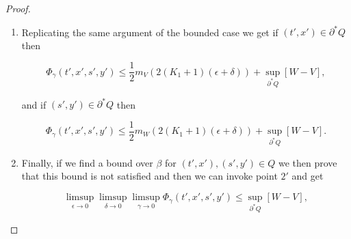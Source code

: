 \begin{proof}
\begin{enumerate}[label=\arabic*')]
        From $\Phi_{\gamma}(t',x',s',y')\geq\Phi_{\gamma}(t',y',s',y')$ we get

        \begin{align*}
            \frac{1}{2\epsilon}\abs{x'-y'}^2 & \leq W(t',x')-W(t',x') + \frac{\gamma}{2}[\abs{y'-x_{\gamma}}^2-\abs{x'-x_{\gamma}}^2] \\
            & \leq \frac{1}{2}m_W(\abs{x'-y'}^2) + \gamma\abs{x'-y'}^2 + \frac{\gamma}{2}\abs{x'-x_{\gamma}}^2 \\
            & \leq \frac{1}{2}m_W(\abs{x'-y'}^2) + \gamma\abs{x'-y'}^2 + \gamma,
        \end{align*}

        which implies

        \[\frac{1}{4\epsilon}\abs{x'-y'}^2\leq \frac{1}{2}m_W(\abs{x'-y'}^2)+\gamma\Rightarrow \abs{x'-y'}^2\leq 2(K_1+1)\epsilon.\]

        Therefore, we get

        \[\frac{1}{4\epsilon}\abs{x'-y'}^2\leq \left(\frac{1}{2\epsilon}-\gamma\right)\abs{x'-y'}^2\leq \frac{1}{2}m_W\left(2(K_1+1)\epsilon\right)+\gamma,\]

        hence the second equation in \ref{4-2-inproofSup:unboundedCLAIMS}.

        \item Replicating the same argument of the bounded case we get if $(t',x')\in\partial^{\ast}Q$ then
        
        \begin{equation*}
            \Phi_{\gamma}(t',x',s',y') \leq \frac{1}{2}m_V\left(2(K_1+1)(\epsilon+\delta)\right) + \sup_{\partial^{\ast}Q}[W-V],
        \end{equation*}

        and if $(s',y')\in\partial^{\ast}Q$ then

        \begin{equation*}
            \Phi_{\gamma}(t',x',s',y') \leq \frac{1}{2}m_W\left(2(K_1+1)(\epsilon+\delta)\right) + \sup_{\partial^{\ast}Q}[W-V].
        \end{equation*}

        \item Finally, if we find a bound over $\beta$ for $(t',x'),(s',y')\in Q$ we then prove that this bound is not satisfied and then we can invoke 
        point $2'$ and get

        \begin{equation*}
            \limsup_{\epsilon\to0}\limsup_{\delta\to0}\limsup_{\gamma\to0}\Phi_{\gamma}(t',x',s',y') \leq \sup_{\partial^{\ast}Q}[W-V],
        \end{equation*}


\end{enumerate}
\end{proof}
